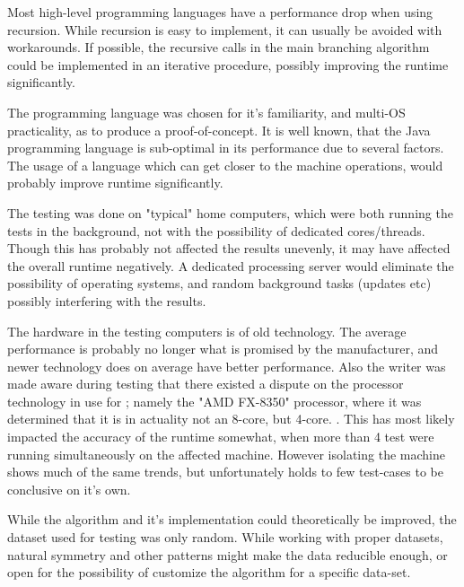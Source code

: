 \documentclass[a4paper]{article}
\begin{document}
Most high-level programming languages have a performance drop when using recursion. While recursion is easy to implement, it can
usually be avoided with workarounds. If possible, the recursive calls in the main branching algorithm could be implemented
in an iterative procedure, possibly improving the runtime significantly.

The programming language was chosen for it's familiarity, and multi-OS practicality, as to produce a proof-of-concept.
It is well known, that the Java programming language is sub-optimal in its performance due to several
factors. The usage of a language which can get closer to the machine operations, would probably improve
runtime significantly.

The testing was done on "typical" home computers, which were both running the tests in the background, not
with the possibility of dedicated cores/threads. Though this has probably not affected the results unevenly,
it may have affected the overall runtime negatively. A dedicated processing server would eliminate the
possibility of operating systems, and random background tasks (updates etc) possibly
interfering with the results.

The hardware in the testing computers is of old technology. The average performance is probably no longer what
is promised by the manufacturer, and newer technology does on average have better performance. Also the writer
was made aware during testing that there existed a dispute on the processor technology in use for ;
namely the "AMD FX-8350" processor, where it was determined that it is in actuality not an 8-core, but 4-core.
\cite{dickey_v._advanced_micro_devices:inc._2015,dickey_v._advanced_micro_devices:inc._2020,chaim_gartenberg_2019}. This 
has most likely impacted the accuracy of the runtime somewhat, when more than 4 test were running simultaneously on 
the affected machine. However isolating the machine shows much of the same trends, but unfortunately holds to few test-cases to 
be conclusive on it's own.

While the algorithm and it's implementation could theoretically be improved, the dataset used for testing was only
random. While working with proper datasets, natural symmetry and other patterns might make the data reducible enough,
or open for the possibility of customize the algorithm for a specific data-set.




%
%
\newpage

\end{document}
